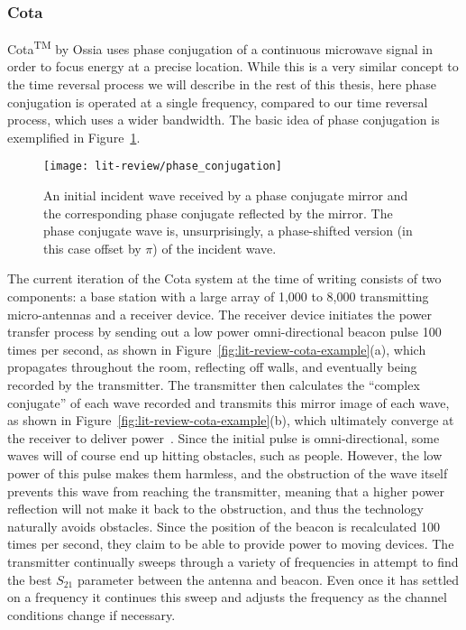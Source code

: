\subsubsection{Cota}

Cota\textsuperscript{TM} by Ossia uses phase conjugation of a continuous microwave signal in order to focus energy at a precise location. While this is a very similar concept to the time reversal process we will describe in the rest of this thesis, here phase conjugation is operated at a single frequency, compared to our time reversal process, which uses a wider bandwidth. The basic idea of phase conjugation is exemplified in Figure~\ref{fig:lit-review-phase-conj}.

\begin{figure}
\centering
\texttt{[image: lit-review/phase\_conjugation]}
    \caption[Phase Conjugation Example]{An initial incident wave received by a phase conjugate mirror and the corresponding phase conjugate reflected by the mirror. The phase conjugate wave is, unsurprisingly, a phase-shifted version (in this case offset by $\pi$) of the incident wave.}
    \label{fig:lit-review-phase-conj}
\end{figure}

The current iteration of the Cota system at the time of writing consists of two components: a base station with a large array of 1,000 to 8,000 transmitting micro-antennas and a receiver device. The receiver device initiates the power transfer process by sending out a low power omni-directional beacon pulse 100 times per second, as shown in Figure~\ref{fig:lit-review-cota-example}(a), which propagates throughout the room, reflecting off walls, and eventually being recorded by the transmitter. The transmitter then calculates the ``complex conjugate'' of each wave recorded and transmits this mirror image of each wave, as shown in Figure~\ref{fig:lit-review-cota-example}(b), which ultimately converge at the receiver to deliver power~\cite{cota-handout}. Since the initial pulse is omni-directional, some waves will of course end up hitting obstacles, such as people. However, the low power of this pulse makes them harmless, and the obstruction of the wave itself prevents this wave from reaching the transmitter, meaning that a higher power reflection will not make it back to the obstruction, and thus the technology naturally avoids obstacles. Since the position of the beacon is recalculated 100 times per second, they claim to be able to provide power to moving devices. The transmitter continually sweeps through a variety of frequencies in attempt to find the best $S_{21}$ parameter between the antenna and beacon. Even once it has settled on a frequency it continues this sweep and adjusts the frequency as the channel conditions change if necessary.

